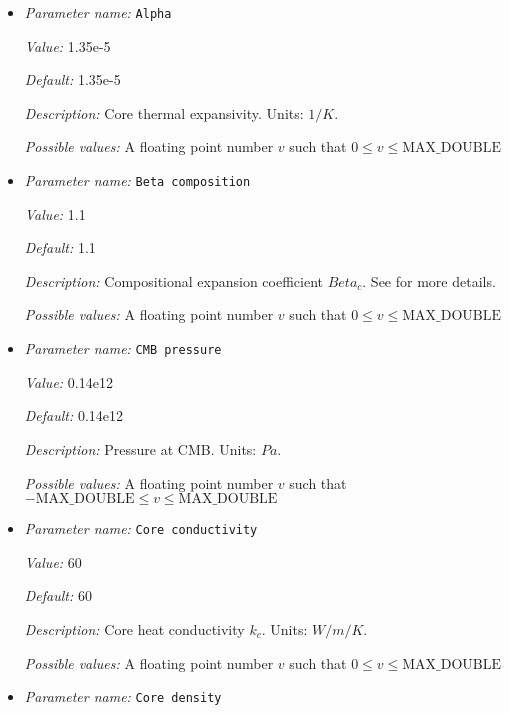 \begin{itemize}
\item {\it Parameter name:} {\tt Alpha}
\label{parameters:Boundary temperature model/Dynamic core/Alpha}


{\it Value:} 1.35e-5


{\it Default:} 1.35e-5


{\it Description:} Core thermal expansivity. Units: $1/K$.


{\it Possible values:} A floating point number $v$ such that $0 \leq v \leq \text{MAX\_DOUBLE}$
\item {\it Parameter name:} {\tt Beta composition}
\label{parameters:Boundary temperature model/Dynamic core/Beta composition}


{\it Value:} 1.1


{\it Default:} 1.1


{\it Description:} Compositional expansion coefficient $Beta_c$. See \cite{NPB+04} for more details.


{\it Possible values:} A floating point number $v$ such that $0 \leq v \leq \text{MAX\_DOUBLE}$
\item {\it Parameter name:} {\tt CMB pressure}
\label{parameters:Boundary temperature model/Dynamic core/CMB pressure}


{\it Value:} 0.14e12


{\it Default:} 0.14e12


{\it Description:} Pressure at CMB. Units: $Pa$.


{\it Possible values:} A floating point number $v$ such that $-\text{MAX\_DOUBLE} \leq v \leq \text{MAX\_DOUBLE}$
\item {\it Parameter name:} {\tt Core conductivity}
\label{parameters:Boundary temperature model/Dynamic core/Core conductivity}


{\it Value:} 60


{\it Default:} 60


{\it Description:} Core heat conductivity $k_c$. Units: $W/m/K$.


{\it Possible values:} A floating point number $v$ such that $0 \leq v \leq \text{MAX\_DOUBLE}$
\item {\it Parameter name:} {\tt Core density}
\label{parameters:Boundary temperature model/Dynamic core/Core density}



\end{itemize}
